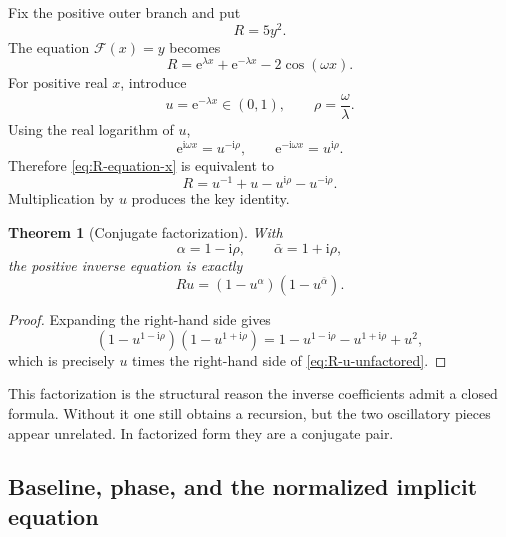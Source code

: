 \documentclass[11pt,oneside]{article}
\numberwithin{equation}{section}
\theoremstyle{plain}
\newtheorem{theorem}{Theorem}[section]
\theoremstyle{definition}
\theoremstyle{remark}
\newcommand{\Fcal}{\mathcal{F}}
\newcommand{\e}{\mathrm e}
\newcommand{\ii}{\mathrm i}
\begin{document}
Fix the positive outer branch and put
\begin{equation}\label{eq:R-def}
 R=5y^2.
\end{equation}
The equation \(\Fcal(x)=y\) becomes
\begin{equation}\label{eq:R-equation-x}
 R=\e^{\lambda x}+\e^{-\lambda x}-2\cos(\omega x).
\end{equation}
For positive real \(x\), introduce
\begin{equation}\label{eq:u-def}
 u=\e^{-\lambda x}\in(0,1),
 \qquad \rho=\frac\omega\lambda.
\end{equation}
Using the real logarithm of \(u\),
\[
 \e^{\ii\omega x}=u^{-\ii\rho},
 \qquad
 \e^{-\ii\omega x}=u^{\ii\rho}.
\]
Therefore \cref{eq:R-equation-x} is equivalent to
\begin{equation}\label{eq:R-u-unfactored}
 R=u^{-1}+u-u^{\ii\rho}-u^{-\ii\rho}.
\end{equation}
Multiplication by \(u\) produces the key identity.

\begin{theorem}[Conjugate factorization]\label{thm:factorization}
With
\begin{equation}\label{eq:alpha-def}
 \alpha=1-\ii\rho,
 \qquad
 \bar\alpha=1+\ii\rho,
\end{equation}
the positive inverse equation is exactly
\begin{equation}\label{eq:factorized-u}
 Ru=(1-u^\alpha)(1-u^{\bar\alpha}).
\end{equation}
\end{theorem}

\begin{proof}
Expanding the right-hand side gives
\[
 (1-u^{1-\ii\rho})(1-u^{1+\ii\rho})
 =1-u^{1-\ii\rho}-u^{1+\ii\rho}+u^2,
\]
which is precisely \(u\) times the right-hand side of
\cref{eq:R-u-unfactored}.
\end{proof}

This factorization is the structural reason the inverse coefficients admit
a closed formula.  Without it one still obtains a recursion, but the two
oscillatory pieces appear unrelated.  In factorized form they are a
conjugate pair.

\subsection{Baseline, phase, and the normalized implicit equation}
\end{document}

